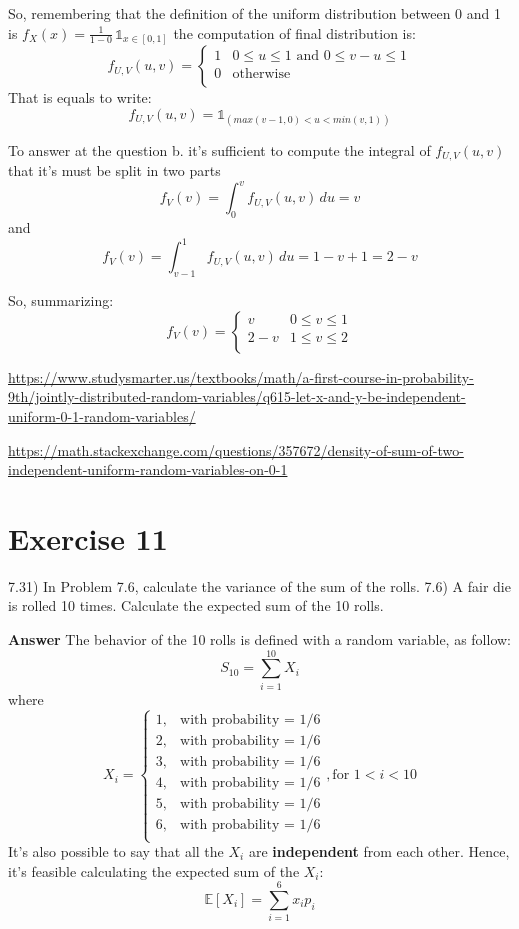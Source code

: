 \documentclass[
]{article}
\begin{document}
So, remembering that the definition of the uniform distribution between
0 and 1 is \(f_X(x)=\frac{1}{1-0} \, \mathbb{1}_{x \in [0, 1]}\) the
computation of final distribution is: \[
f_{U,V}(u, v) = \begin{cases} 
1 & 0\leq u\leq 1 \mbox{ and } 0\leq v-u \leq 1\\
0 & \mbox{otherwise}\\
\end{cases}\] That is equals to write:
\[f_{U,V}(u, v)= \mathbb{1}_{(max(v-1,0) < u <min(v, 1))} \]

To answer at the question b. it's sufficient to compute the integral of
\(f_{U, V}(u, v)\) that it's must be split in two parts
\[ f_V(v)=\int_{0}^{v} f_{U, V}(u, v) \,du = v\] and
\[f_V(v)=\int_{v-1}^{1} f_{U, V}(u, v) \,du = 1-v+1=2-v\]

So, summarizing: \[f_{V}(v) = \begin{cases} 
v & 0\leq v\leq 1 \\
2-v & 1\leq v\leq 2\\
\end{cases}\]

\url{https://www.studysmarter.us/textbooks/math/a-first-course-in-probability-9th/jointly-distributed-random-variables/q615-let-x-and-y-be-independent-uniform-0-1-random-variables/}

\url{https://math.stackexchange.com/questions/357672/density-of-sum-of-two-independent-uniform-random-variables-on-0-1}

\hypertarget{exercise-11}{%
\section{Exercise 11}\label{exercise-11}}

7.31) In Problem 7.6, calculate the variance of the sum of the rolls.
7.6) A fair die is rolled 10 times. Calculate the expected sum of the 10
rolls.

\textbf{Answer} The behavior of the 10 rolls is defined with a random
variable, as follow: \[S_{10}=\sum_{i=1}^{10}{X_i}\] where
\[X_i = \begin{cases} 
1, & \mbox{with probability = 1/6}\\
2, & \mbox{with probability = 1/6}\\
3, & \mbox{with probability = 1/6}\\
4, & \mbox{with probability = 1/6}\\
5, & \mbox{with probability = 1/6}\\
6, & \mbox{with probability = 1/6}\\
\end{cases}, \text{for }1<i<10\] It's also possible to say that all the
\(X_i\) are \textbf{independent} from each other. Hence, it's feasible
calculating the expected sum of the \(X_i\):
\[\mathbb E[X_i]=\sum_{i=1}^{6}{x_ip_i}\]
\end{document}
